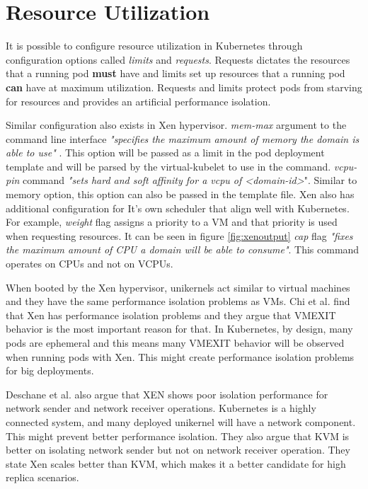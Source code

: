 \section{Resource Utilization}

It is possible to configure resource utilization in Kubernetes through configuration options called \textit{limits} and \textit{requests}. Requests dictates the resources that a running pod \textbf{must} have and limits set up resources that a running pod \textbf{can} have at maximum utilization. Requests and limits protect pods from starving for resources and provides an artificial performance isolation.

Similar configuration also exists in Xen hypervisor. \textit{mem-max} argument to the command line interface \textit{"specifies the maximum amount of memory the domain is able to use"} \cite{xl-man-page}. This option will be passed as a limit in the pod deployment template and will be parsed by the virtual-kubelet to use in the command. \textit{vcpu-pin} command \textit{"sets hard and soft affinity for a vcpu of <domain-id>}". Similar to memory option, this option can also be passed in the template file. Xen also has additional configuration for It's own scheduler that align well with Kubernetes. For example, \textit{weight} flag assigns a priority to a VM and that priority is used when requesting resources. It can be seen in figure \ref{fig:xenoutput} \textit{cap} flag \textit{"fixes the maximum amount of CPU a domain will be able to consume"}. This command operates on CPUs and not on VCPUs.

When booted by the Xen hypervisor, unikernels act similar to virtual machines and they have the same performance isolation problems as VMs. Chi et al.\cite{performance-isolation} find that Xen has performance isolation problems and they argue that VMEXIT behavior is the most important reason for that. In Kubernetes, by design, many pods are ephemeral and this means many VMEXIT behavior will be observed when running pods with Xen. This might create performance isolation problems for big deployments.

Deschane et al. \cite{Deshane} also argue that XEN shows poor isolation performance for network sender and network receiver operations. Kubernetes is a highly connected system, and many deployed unikernel will have a network component. This might prevent better performance isolation. They also argue that KVM is better on isolating network sender but not on network receiver operation. They state Xen scales better than KVM, which makes it a better candidate for high replica scenarios.